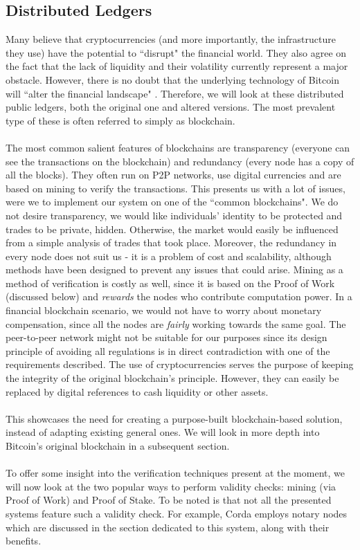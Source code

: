 \documentclass[12pt,twoside]{article}
\begin{document}
\subsection{Distributed Ledgers}
\label{sub:DistributedLedgers}
Many believe that cryptocurrencies (and more importantly, the infrastructure they use) have the potential to ``disrupt" the financial world. They also agree on the fact that the lack of liquidity and their volatility currently represent a major obstacle. However, there is no doubt that the underlying technology of Bitcoin will ``alter the financial landscape" \cite{CMM:RN}. Therefore, we will look at these distributed public ledgers, both the original one and altered versions. The most prevalent type of these is often referred to simply as blockchain.
\\ \\
The most common salient features of blockchains are transparency (everyone can see the transactions on the blockchain) and redundancy (every node has a copy of all the blocks). They often run on P2P networks, use digital currencies and are based on mining to verify the transactions. This presents us with a lot of issues, were we to implement our system on one of the ``common blockchains". We do not desire transparency, we would like individuals' identity to be protected and trades to be private, hidden. Otherwise, the market would easily be influenced from a simple analysis of trades that took place. Moreover, the redundancy in every node does not suit us - it is a problem of cost and scalability, although methods have been designed to prevent any issues that could arise. Mining as a method of verification is costly as well, since it is based on the Proof of Work (discussed below) and \textit{rewards} the nodes who contribute computation power. In a financial blockchain scenario, we would not have to worry about monetary compensation, since all the nodes are \textit{fairly} working towards the same goal. The peer-to-peer network might not be suitable for our purposes since its design principle of avoiding all regulations is in direct contradiction with one of the requirements described. The use of cryptocurrencies serves the purpose of keeping the integrity of the original blockchain's principle. However, they can easily be replaced by digital references to cash liquidity or other assets.
\\ \\
This showcases the need for creating a purpose-built blockchain-based solution, instead of adapting existing general ones. We will look in more depth into Bitcoin's original blockchain in a subsequent section. 
\\ \\
To offer some insight into the verification techniques present at the moment, we will now look at the two popular ways to perform validity checks: mining (via Proof of Work) and Proof of Stake. To be noted is that not all the presented systems feature such a validity check. For example, Corda employs notary nodes which are discussed in the section dedicated to this system, along with their benefits.
\end{document}
